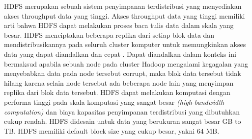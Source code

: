 HDFS merupakan sebuah sistem penyimpanan terdistribusi yang menyediakan akses throughput data yang tinggi. Akses throughput data yang tinggi memiliki arti bahwa HDFS dapat melakukan proses baca tulis data dalam skala yang besar. HDFS menciptakan beberapa replika dari setiap blok data dan mendistribusikannya pada seluruh cluster komputer untuk memungkinkan akses data yang dapat diandalkan dan cepat \cite{Holmes:2012:HP:2543981}. Dapat diandalkan dalam konteks ini bermaksud apabila sebuah node pada cluster Hadoop mengalami kegagalan yang menyebabkan data pada node tersebut corrupt, maka blok data tersebut tidak hilang karena selain node tersebut ada beberapa node lain yang menyimpan replika dari blok data tersebut. HDFS dapat melakukan komputasi dengan performa tinggi pada skala komputasi yang sangat besar \textit{(high-bandwidth computation)} dan biaya kapasitas penyimpanan terdistribusi yang dibutuhkan cukup rendah. HDFS didesain untuk data yang berukuran sangat besar GB to TB. HDFS memiliki default block size yang cukup besar, yakni 64 MB.


